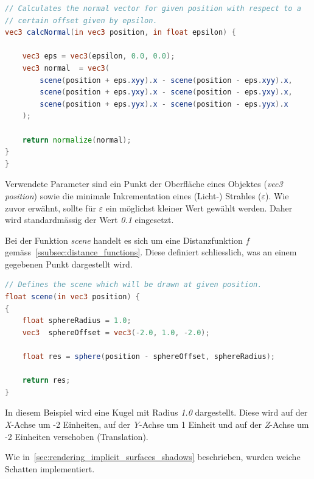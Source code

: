 \begin{lstlisting}[language=GLSL,caption={Berechnung der Normalen einer
        impliziten Oberfläche in
        GLSL.},label={alg:glsl_normal},captionpos=b,emph={calcNormal}]
// Calculates the normal vector for given position with respect to a
// certain offset given by epsilon.
vec3 calcNormal(in vec3 position, in float epsilon) {

    vec3 eps = vec3(epsilon, 0.0, 0.0);
    vec3 normal  = vec3(
        scene(position + eps.xyy).x - scene(position - eps.xyy).x,
        scene(position + eps.yxy).x - scene(position - eps.yxy).x,
        scene(position + eps.yyx).x - scene(position - eps.yyx).x
    );

    return normalize(normal);
}
}
\end{lstlisting}

Verwendete Parameter sind ein Punkt der Oberfläche eines Objektes
(\textit{vec3 position}) sowie die minimale Inkrementation eines
(Licht-) Strahles ($\varepsilon$). Wie zuvor erwähnt, sollte
für $\varepsilon$ ein möglichst kleiner Wert gewählt werden. Daher wird
standardmässig der Wert \textit{0.1} eingesetzt.

Bei der Funktion \textit{scene} handelt es sich um eine Distanzfunktion
$f$ gemäss~\autoref{ssubsec:distance_functions}. Diese definiert
schliesslich, was an einem gegebenen Punkt dargestellt wird.

\begin{lstlisting}[language=GLSL,caption={Distanzfunktion $f$ in
        GLSL.},label={alg:glsl_distance_func},captionpos=b,emph={scene}]
// Defines the scene which will be drawn at given position.
float scene(in vec3 position) {
{
    float sphereRadius = 1.0;
    vec3  sphereOffset = vec3(-2.0, 1.0, -2.0);

    float res = sphere(position - sphereOffset, sphereRadius);

    return res;
}
\end{lstlisting}

In diesem Beispiel wird eine Kugel mit Radius \textit{1.0} dargestellt.
Diese wird auf der \textit{X}-Achse um -2 Einheiten, auf der
\textit{Y}-Achse um 1 Einheit und auf der \textit{Z}-Achse um -2
Einheiten verschoben (Translation).

Wie in~\autoref{sec:rendering_implicit_surfaces_shadows} beschrieben,
wurden weiche Schatten implementiert.

